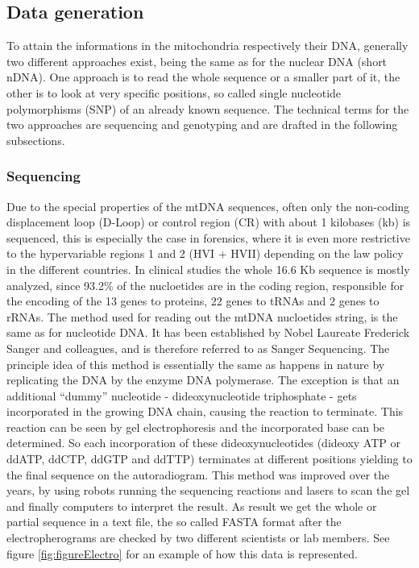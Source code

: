 \subsection{Data generation}
\label{sec:dataGeneration}
To attain the informations in the mitochondria respectively their DNA, generally two different approaches exist, being the same as for the nuclear DNA (short nDNA). One approach is to read the whole sequence or a smaller part of it, the other is to look at very specific positions, so called single nucleotide polymorphisms (SNP) of an already known sequence. The technical terms for the two approaches are sequencing and genotyping and are drafted in the following subsections.
\subsubsection{Sequencing}Due to the special properties of the mtDNA sequences, often only the non-coding displacement loop (D-Loop) or control region (CR) with about 1 kilobases (kb) is sequenced, this is especially the case in forensics, where it is even more restrictive to the hypervariable regions 1 and 2 (HVI + HVII) depending on the law policy in the different countries. In clinical studies the whole 16.6 Kb sequence is mostly analyzed, since 93.2\% of the nucloetides are in the coding region, responsible for the encoding of the 13 genes to proteins, 22 genes to tRNAs and 2 genes to rRNAs\cite{Sosa2012}. The method used for reading out the mtDNA nucloetides string, is the same as for nucleotide DNA. It has been established by Nobel Laureate Frederick Sanger and colleagues, and is therefore referred to as Sanger Sequencing. The principle idea of this method is essentially the same as happens in nature by replicating the DNA by the enzyme DNA polymerase.
The exception is that an additional "`dummy"' nucleotide - dideoxynucleotide triphosphate - gets incorporated in the growing DNA chain, causing the reaction to terminate. This reaction can be seen by gel electrophoresis and the incorporated base can be determined. So each incorporation of these dideoxynucleotides (dideoxy ATP or ddATP, ddCTP, ddGTP and ddTTP) terminates at different positions yielding to the final sequence on the autoradiogram.
This method was improved over the years, by using robots running the sequencing reactions and lasers to scan the gel and finally computers to interpret the result\cite{WallaceRobertA.SandersGeraldP.1996}. As result we get the whole or partial sequence in a text file, the so called FASTA format after the electropherograms are checked by two different scientists or lab members. See figure \ref{fig:figureElectro} for an example of how this data is represented. 
